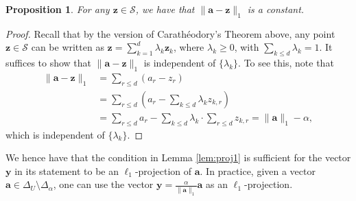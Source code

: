 \documentclass[conference,letterpaper]{IEEEtran}
\newtheorem{proposition}{Proposition}[section]
\theoremstyle{remark}
\theoremstyle{definition}
\begin{document}
\begin{proposition}
	\label{prop:proj1}
	For any $\mathbf{z}\in \mathcal{S}$, we have that $\lVert \mathbf{a} - \mathbf{z}\rVert_1$ is a constant.
\end{proposition}
\begin{proof}
	Recall that by the version of Carath\'eodory's Theorem above, any point $\mathbf{z}\in \mathcal{S}$ can be written as $\mathbf{z} = \sum_{k=1}^d \lambda_k \mathbf{z}_k$, where $\lambda_k\geq 0$, with $\sum_{k\leq d} \lambda_k = 1$.  It suffices to show that $\lVert \mathbf{a} - \mathbf{z}\rVert_1$ is independent of $\{\lambda_k\}$. To see this, note that
	\begin{align*}
		\lVert \mathbf{a} - \mathbf{z}\rVert_1&= \sum_{r\leq d} (a_r-z_r)\\
		&=\sum_{r\leq d} (a_r-\sum_{k\leq d} \lambda_k z_{k,r})\\
		&= \sum_{r\leq d} a_r - \sum_{k\leq d} \lambda_k\cdot \sum_{r\leq d} z_{k,r} = \lVert \mathbf{a}\rVert_1 - \alpha,
	\end{align*}
which is independent of $\{\lambda_k\}$.
\end{proof}
We hence have that the condition in Lemma \ref{lem:proj1} is sufficient for the vector $\mathbf{y}$ in its statement to be an $\ell_1$-projection of $\mathbf{a}$. In practice, given a vector $\mathbf{a}\in \Delta_U\setminus \Delta_\alpha$, one can use the vector $\mathbf{y} = \frac{\alpha}{\lVert \mathbf{a}\rVert_1} \mathbf{a}$ as an $\ell_1$-projection.
%
%
%
\end{document}

